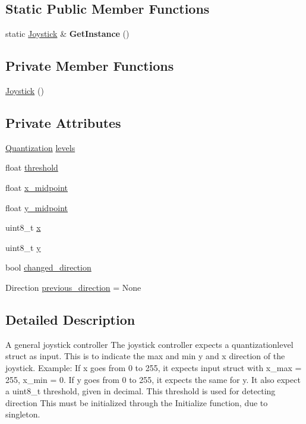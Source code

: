 \subsection*{Static Public Member Functions}
\begin{DoxyCompactItemize}
\item 
\hypertarget{class_joystick_a960c53cb9f02733747314f00b2e23b24}{}\label{class_joystick_a960c53cb9f02733747314f00b2e23b24} 
static \hyperlink{class_joystick}{Joystick} \& {\bfseries Get\+Instance} ()
\end{DoxyCompactItemize}
\subsection*{Private Member Functions}
\begin{DoxyCompactItemize}
\item 
\hyperlink{class_joystick_a158b1f77b78717efbf1b8fac43b1fcef}{Joystick} ()
\end{DoxyCompactItemize}
\subsection*{Private Attributes}
\begin{DoxyCompactItemize}
\item 
\hyperlink{struct_quantization}{Quantization} \hyperlink{class_joystick_ae60f2daf5c456900e821b2fde565ef38}{levels}
\item 
float \hyperlink{class_joystick_a30b68bce5589674148d43b4854b25cef}{threshold}
\item 
float \hyperlink{class_joystick_ace9fd47e90cc88de622f1b8ba7650156}{x\+\_\+midpoint}
\item 
float \hyperlink{class_joystick_a06e00f03f6dd0859663a7a01ada1d3c1}{y\+\_\+midpoint}
\item 
uint8\+\_\+t \hyperlink{class_joystick_abeb4f1563a57266700a48ba5aa49b4cd}{x}
\item 
uint8\+\_\+t \hyperlink{class_joystick_a691b70ed215adf414e0ab4edba5407a2}{y}
\item 
bool \hyperlink{class_joystick_a3e9a785b0764f3b0666e87e77b373b74}{changed\+\_\+direction}
\item 
Direction \hyperlink{class_joystick_abf9509216c86d03fb76abc7ff4507f90}{previous\+\_\+direction} = None
\end{DoxyCompactItemize}


\subsection{Detailed Description}
A general joystick controller The joystick controller expects a quantizationlevel struct as input. This is to indicate the max and min y and x direction of the joystick. Example\+: If x goes from 0 to 255, it expects input struct with x\+\_\+max = 255, x\+\_\+min = 0. If y goes from 0 to 255, it expects the same for y. It also expect a uint8\+\_\+t threshold, given in decimal. This threshold is used for detecting direction This must be initialized through the Initialize function, due to singleton. 

